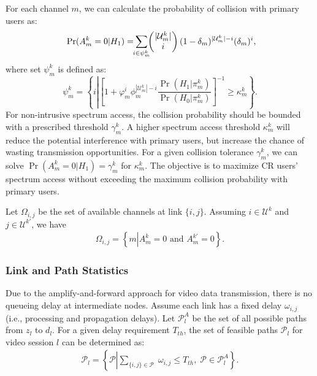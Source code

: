 \documentclass[12pt,onecolumn,draftclsnofoot]{IEEEtran} %
\begin{document}
For each channel $m$, we can calculate the probability of collision with primary users as:
\begin{eqnarray}\label{eq:ProbLinkCol}
  \Pr(A_m^k=0|H_1) = \hspace{-0.05in} \sum_{i \in \psi_m^k} 
		\hspace{-0.06in} \left( \hspace{-0.06in}
		\begin{array}{c} 
			|\mathcal{U}_m^k| \\
			i
		\end{array}
		\hspace{-0.06in} \right)
		(1-\delta_m)^{|\mathcal{U}_m^k|-i}(\delta_m)^i, \hspace{-0.05in}
\end{eqnarray}
where set $\psi_m^k$ is defined as:
\begin{equation}
  \psi_m^k = \left\{ i \left| \left[ 1 + \varphi_m^i\phi_m^{ | \mathcal{U}_m^k|-i} 
	     \frac{\Pr(H_1|\pi_m^k)}{\Pr(H_0|\pi_m^k)} \right]^{-1}  \ge \kappa_m^k \right. \right\}.
\end{equation}
For non-intrusive spectrum access, the collision probability should be bounded with a prescribed threshold $\gamma_m^k$. 
A higher spectrum access threshold $\kappa_m^k$ will reduce the potential interference with primary users, but increase the chance of wasting transmission opportunities.  For a given collision tolerance $\gamma_m^k$, we can solve $\Pr(A_m^k=0|H_1) = \gamma_m^k$ for $\kappa_m^k$.  The objective is to maximize CR users' spectrum access without exceeding the maximum collision probability with primary users. 

Let $\Omega_{i,j}$ be the set of available channels at link $\{i,j\}$. Assuming $i \in \mathcal{U}^k$ and $j \in \mathcal{U}^{k'}$, we have
\begin{eqnarray}\label{eq:DefChi}
  \Omega_{i,j} = \left\{ m \left| A_m^k=0 \mbox{ and } A_m^{k'}=0 \right. \right\}. 
\end{eqnarray}


\subsubsection{Link and Path Statistics}

Due to the amplify-and-forward approach for video data transmission, there is no queueing delay at intermediate nodes.  Assume each link has a fixed delay $\omega_{i,j}$ (i.e., processing and propagation delays).  Let $\mathcal{P}_l^A$ be the set of all possible paths from $z_l$ to $d_l$.  For a given delay requirement $T_{th}$, the set of feasible paths $\mathcal{P}_l$ for video session $l$ can be determined as:
\begin{eqnarray}\label{eq:PathDelay}
  \mathcal{P}_l = \left\{ \mathcal{P} \left| \sum_{\{i,j\} \in \mathcal{P}}
      \; \omega_{i,j} \le T_{th}, \; \mathcal{P} \in \mathcal{P}_l^A \right. \right\}.
\end{eqnarray}
 
\end{document}
